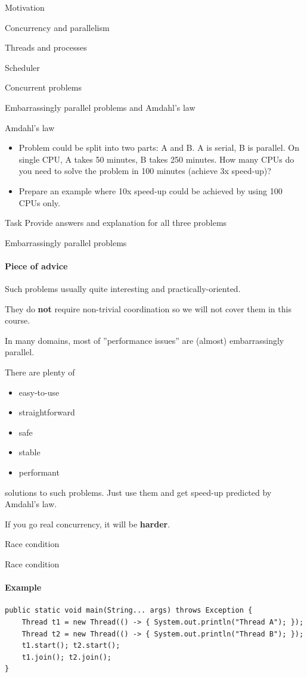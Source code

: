 \begin{section}{Motivation}
\begin{section}{Concurrency and parallelism}
\begin{section}{Threads and processes}
\begin{section}{Scheduler}
\begin{section}{Concurrent problems}
\begin{subsection}{Embarrassingly parallel problems and Amdahl's law}
\begin{frame}[fragile]{Amdahl's law}
\begin{itemize}
    \item Problem could be split into two parts: A and B. A is serial, B is parallel. On single CPU, A takes 50 minutes, B takes 250 minutes. How many CPUs do you need to solve the problem in 100 minutes (achieve 3x speed-up)?

    \item Prepare an example where 10x speed-up could be achieved by using 100 CPUs only.
\end{itemize}

\pause

\begin{homeworkmail}{Task \taskAmdhal}{
    Provide answers and explanation for all three problems
}
\end{homeworkmail}

\end{frame}


\begin{frame}{Embarrassingly parallel problems}
\framesubtitle{Piece of advice}

Such problems usually quite interesting and practically-oriented.

They do \textbf{not} require non-trivial coordination so we will not cover them in this course.

In many domains, most of ''performance issues'' are (almost) embarrassingly parallel.

There are plenty of
\begin{itemize}
        \item easy-to-use
        \item straightforward
        \item safe
        \item stable
        \item performant
\end{itemize}
solutions to such problems. Just use them and get speed-up predicted by Amdahl's law.

If you go real concurrency, it will be \textbf{harder}.
\end{frame}

\begin{subsection}{Race condition}
\showTOCSub

\begin{frame}[fragile]{Race condition}
\framesubtitle{Example}

\begin{verbatim}
public static void main(String... args) throws Exception {
    Thread t1 = new Thread(() -> { System.out.println("Thread A"); });
    Thread t2 = new Thread(() -> { System.out.println("Thread B"); });
    t1.start(); t2.start();
    t1.join(); t2.join();
}
\end{verbatim}


\end{frame}
\end{subsection}
\end{subsection}
\end{section}
\end{section}
\end{section}
\end{section}
\end{section}
